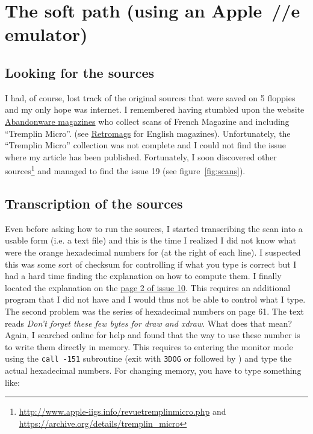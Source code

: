 \section*{The soft path (using an Apple~//e emulator)}

\subsection*{Looking for the sources}
I had, of course, lost track of the original sources that were saved on
5 floppies and my only hope was internet. I
remembered having stumbled upon the website
\href{https://www.abandonware-magazines.org/}{Abandonware magazines}
who collect scans of French Magazine and including ``Tremplin Micro''.
(see \href{https://www.retromags.com/}{Retromags} for English magazines).
Unfortunately, the ``Tremplin Micro'' collection was not complete and I could
not find the issue where my article has been published. Fortunately, I soon
discovered other
sources\footnote{\url{http://www.apple-iigs.info/revuetremplinmicro.php}
and \url{https://archive.org/details/tremplin_micro}} and managed to find the
issue 19 (see figure~\ref{fig:scans}).

\subsection*{Transcription of the sources}
Even before asking how to run the sources, I started transcribing the scan into
a usable form (i.e. a text file) and this is the time I realized I did not know
what were the orange hexadecimal numbers for (at the right of each line). I
suspected this was some sort of checksum for controlling if what you type is
correct but I had a hard time finding the explanation on how to compute them. I
finally located the explanation on
the \href{https://archive.org/details/tremplin_micro_newsletter_issue_10/page/n3}{page
2 of issue 10}. This requires an additional program that I did not have and I
would thus not be able to control what I type.\\

The second problem was the series of hexadecimal numbers on page 61. The text
reads {\em Don't forget these few bytes for draw and xdraw}. What does that
mean? Again, I searched online for help and found that the way to use these
number is to write them directly in memory. This requires to entering the
monitor mode using the {\tt call -151} subroutine (exit with {\tt 3DOG}
or  followed by \keys{\return}) and type the actual hexadecimal
numbers. For changing memory, you have to type something like:\\

